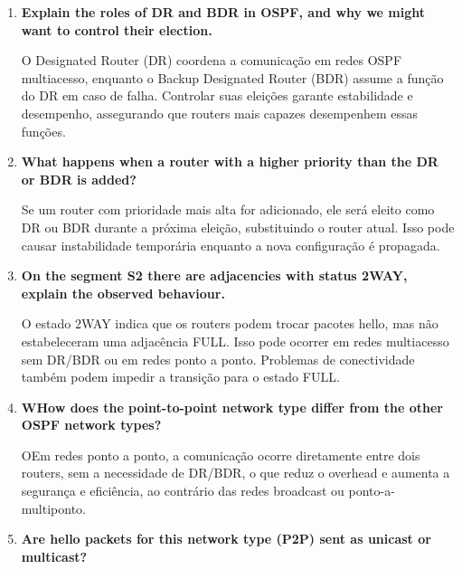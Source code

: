 \documentclass[11pt,english, openright, oneside]{book}
\begin{document}
\begin{enumerate}
  \item \textbf{Explain the roles of DR and BDR in OSPF, and why we might want to control their election.}
  \vspace{0.2cm}

  \par O Designated Router (DR) coordena a comunicação em redes OSPF multiacesso, enquanto o Backup Designated Router (BDR) assume a função do DR em caso de falha. Controlar suas eleições garante estabilidade e desempenho, assegurando que routers mais capazes desempenhem essas funções.
  \vspace{0.2cm}

  \item \textbf{What happens when a router with a higher priority than the DR or BDR is added?}
  \vspace{0.2cm}

  \par Se um router com prioridade mais alta for adicionado, ele será eleito como DR ou BDR durante a próxima eleição, substituindo o router atual. Isso pode causar instabilidade temporária enquanto a nova configuração é propagada.
  \vspace{0.2cm}

  \item \textbf{On the segment S2 there are adjacencies with status 2WAY, explain the observed behaviour.}
  \vspace{0.2cm}

  \par O estado 2WAY indica que os routers podem trocar pacotes hello, mas não estabeleceram uma adjacência FULL. Isso pode ocorrer em redes multiacesso sem DR/BDR ou em redes ponto a ponto. Problemas de conectividade também podem impedir a transição para o estado FULL.
  \vspace{0.2cm}

  \item \textbf{WHow does the point-to-point network type differ from the other OSPF network types?}
  \vspace{0.2cm}

  \par OEm redes ponto a ponto, a comunicação ocorre diretamente entre dois routers, sem a necessidade de DR/BDR, o que reduz o overhead e aumenta a segurança e eficiência, ao contrário das redes broadcast ou ponto-a-multiponto.
  \vspace{0.2cm}

  \item \textbf{Are hello packets for this network type (P2P) sent as unicast or multicast?}
  \vspace{0.2cm}


\end{enumerate}
\end{document}
